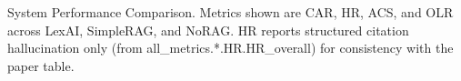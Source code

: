 \caption{System Performance Comparison. Metrics shown are CAR, HR, ACS, and OLR across LexAI, SimpleRAG, and NoRAG. HR reports structured citation hallucination only (from all\_metrics.*.HR.HR\_overall) for consistency with the paper table.}

